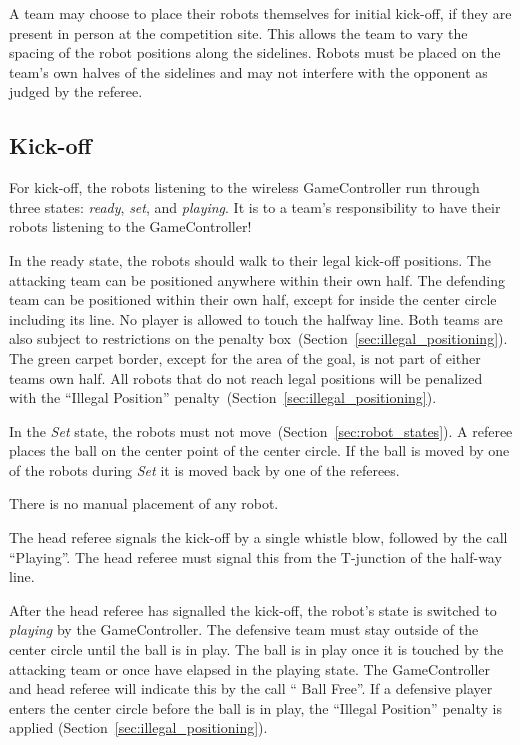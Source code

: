 A team may choose to place their robots themselves for initial kick-off, if they are present in person at the competition site. This allows the team to vary the spacing of the robot positions along the sidelines. Robots must be placed on the team's own halves of the sidelines and may not interfere with the opponent as judged by the referee.

\subsection{Kick-off}
\label{sec:kick-off}
For kick-off, the robots listening to the wireless GameController run through three states: \emph{ready}, \emph{set}, and \emph{playing}.
It is to a team’s responsibility to have their robots listening to the GameController!

In the ready state, the robots should walk to their legal kick-off positions.
The attacking team can be positioned anywhere within their own half.
The defending team can be positioned within their own half, except for inside the center circle including its line.
No player is allowed to touch the halfway line.
Both teams are also subject to restrictions on the penalty box~(\cf Section~\ref{sec:illegal_positioning}).
The green carpet border, except for the area of the goal, is not part of either teams own half. All robots that do not reach legal positions will be penalized with the ``Illegal Position'' penalty~(\cf Section~\ref{sec:illegal_positioning}).

In the \emph{Set} state, the robots must not move~(\cf Section~\ref{sec:robot_states}). A referee places the ball on the center point of the center circle. If the ball is moved by one of the robots during \textit{Set} it is moved back by one of the referees.

There is no manual placement of any robot.

The head referee signals the kick-off by a single whistle blow, followed by the call ``Playing''. The head referee must signal this from the T-junction of the half-way line.

After the head referee has signalled the kick-off, the robot's state is switched to \emph{playing} by the GameController.
The defensive team must stay outside of the center circle until the ball is in play.  The ball is in play once it is touched by the attacking team or once \emph{\KickOffBallFreeTime} have elapsed in the playing state.
The GameController and head referee will indicate this by the call `` Ball Free''.
If a defensive player enters the center circle before the ball is in play, the ``Illegal Position'' penalty is applied (\cf Section~\ref{sec:illegal_positioning}).

